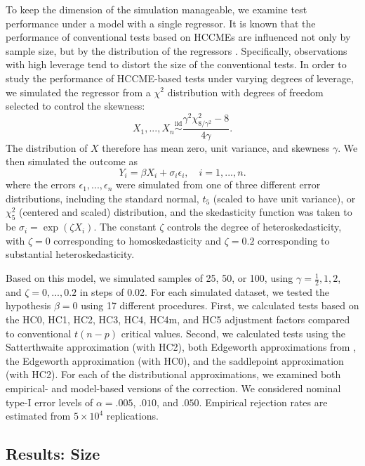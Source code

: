 \documentclass[12pt]{article}\usepackage[]{graphicx}\usepackage[]{color}
\newcommand{\iid}{\stackrel{\text{iid}}{\sim}}
\begin{document}
To keep the dimension of the simulation manageable, we examine test performance under a model with a single regressor. 
It is known that the performance of conventional tests based on HCCMEs are influenced not only by sample size, but by the distribution of the regressors \citep{Chesher1991finite, Cribari-Neto2004asymptotic, Kauermann2001note}. 
Specifically, observations with high leverage tend to distort the size of the conventional tests. 
In order to study the performance of HCCME-based tests under varying degrees of leverage, we simulated the regressor from a $\chi^2$ distribution with degrees of freedom selected to control the skewness:
\[
X_1,...,X_n \iid \frac{\gamma^2 \chi^2_{8 / \gamma^2} - 8 }{4 \gamma}.
\]
The distribution of $X$ therefore has mean zero, unit variance, and skewness $\gamma$. We then simulated the outcome as 
\[
Y_i = \beta X_i + \sigma_i \epsilon_i, \quad i = 1,...,n.
\]
where the errors $\epsilon_1,...,\epsilon_n$ were simulated from one of three different error distributions, including the standard normal, $t_5$ (scaled to have unit variance), or $\chi^2_5$ (centered and scaled) distribution, and the skedasticity function was taken to be $\sigma_i = \exp(\zeta X_i)$. The constant $\zeta$ controls the degree of heteroskedasticity, with $\zeta = 0$ corresponding to homoskedasticity and $\zeta = 0.2$ corresponding to substantial heteroskedasticity. 

Based on this model, we simulated samples of 25, 50, or 100, using $\gamma = \frac{1}{2},1,2$, and $\zeta = 0,...,0.2$ in steps of 0.02. For each simulated dataset, we tested the hypothesis $\beta = 0$ using 17 different procedures. First, we calculated tests based on the HC0, HC1, HC2, HC3, HC4, HC4m, and HC5 adjustment factors compared to conventional $t(n - p)$ critical values. Second, we calculated tests using the Satterthwaite approximation (with HC2), both Edgeworth approximations from \citet[][also using HC2]{Kauermann2001note}, the \citet{Rothenberg1988approximate} Edgeworth approximation (with HC0), and the saddlepoint approximation (with HC2). For each of the distributional approximations, we examined both empirical- and model-based versions of the correction. We considered nominal type-I error levels of $\alpha = .005$, $.010$, and $.050$. Empirical rejection rates are estimated from \ensuremath{5\times 10^{4}} replications.

\subsection{Results: Size}
\end{document}
